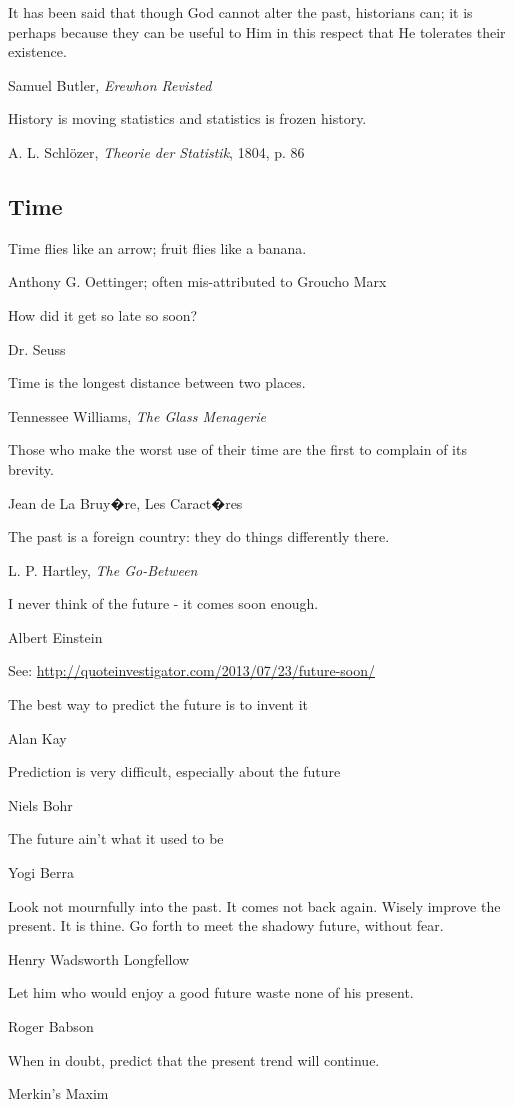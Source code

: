 \epigraph{It has been said that though God cannot alter the past, historians can; it is perhaps because they can be useful to Him in this respect that He tolerates their existence.}{Samuel Butler, \emph{Erewhon Revisted}}

\epigraph{History is moving statistics and statistics is frozen history.}{A. L. Schl\"ozer, \emph{Theorie der Statistik}, 1804, p. 86}


\subsection{Time}

\epigraph{Time flies like an arrow; fruit flies like a banana.}{Anthony G. Oettinger; often mis-attributed to Groucho Marx}

\epigraph{How did it get so late so soon? }{Dr. Seuss}

\epigraph{Time is the longest distance between two places.}{Tennessee Williams, \emph{The Glass Menagerie}}

\epigraph{Those who make the worst use of their time are the first to complain of its brevity.}{Jean de La Bruy�re, Les Caract�res }


\epigraph{The past is a foreign country: they do things differently there.}{L. P. Hartley, \emph{The Go-Between}}

\epigraph{I never think of the future - it comes soon enough.}{Albert Einstein}
See: \url{http://quoteinvestigator.com/2013/07/23/future-soon/}

\epigraph{The best way to predict the future is to invent it}{Alan Kay}

\epigraph{Prediction is very difficult, especially about the future}{Niels Bohr}

\epigraph{The future ain't what it used to be}{Yogi Berra}

\epigraph{Look not mournfully into the past. It comes not back again.  Wisely improve the present. It is thine. Go forth to meet the shadowy future, without fear.}{Henry Wadsworth Longfellow} %

\epigraph{Let him who would enjoy a good future waste none of his present.}{Roger Babson}

\epigraph{When in doubt, predict that the present trend will continue.}{Merkin's Maxim}

